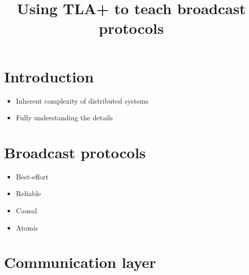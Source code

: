 \documentclass{llncs}
\begin{document}
%
\title{Using TLA+ to teach broadcast protocols}

%
%

\maketitle             

\begin{abstract}


\end{abstract}

\section{Introduction}

\begin{itemize}
\item Inherent complexity of distributed systems
\item Fully understanding the details
\end{itemize}

\section{Broadcast protocols}

\begin{itemize}
\item Best-effort
\item Reliable 
\item Causal
\item Atomic
\end{itemize}


\section{Communication layer}
\end{document}
